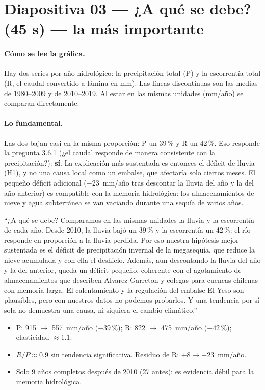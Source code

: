 \documentclass[11pt,letterpaper]{article}
\begin{document}
\section{Diapositiva 03 --- ¿A qué se debe? (45 s) --- la más importante}

\paragraph{Cómo se lee la gráfica.} Hay dos series por año hidrológico: la precipitación total (P) y la
escorrentía total (R, el caudal convertido a lámina en mm). Las líneas discontinuas son las medias de
1980--2009 y de 2010--2019. Al estar en las mismas unidades (mm/año) se comparan directamente.

\paragraph{Lo fundamental.} Las dos bajan casi en la misma proporción: P un 39\,\% y R un 42\,\%. Eso responde
la pregunta 3.6.1 (¿el caudal responde de manera consistente con la precipitación?): \textbf{sí}. La
explicación más sustentada es entonces el déficit de lluvia (H1), y no una causa local como un embalse, que
afectaría solo ciertos meses. El pequeño déficit adicional ($-23$~mm/año tras descontar la lluvia del año y la
del año anterior) es compatible con la memoria hidrológica: los almacenamientos de nieve y agua subterránea se
van vaciando durante una sequía de varios años.

\begin{guion}
``¿A qué se debe? Comparamos en las mismas unidades la lluvia y la escorrentía de cada año. Desde 2010, la
lluvia bajó un 39\,\% y la escorrentía un 42\,\%: el río responde en proporción a la lluvia perdida. Por eso
nuestra hipótesis mejor sustentada es el déficit de precipitación invernal de la megasequía, que reduce la
nieve acumulada y con ella el deshielo. Además, aun descontando la lluvia del año y la del anterior, queda un
déficit pequeño, coherente con el agotamiento de almacenamientos que describen Alvarez-Garreton y colegas para
cuencas chilenas con memoria larga. El calentamiento y la regulación del embalse El Yeso son plausibles,
pero con nuestros datos no podemos probarlos. Y una tendencia por sí sola no demuestra una causa, ni siquiera
el cambio climático.''
\end{guion}

\begin{cifras}
\begin{itemize}
\item P: 915 $\rightarrow$ 557~mm/año ($-39$\,\%); R: 822 $\rightarrow$ 475~mm/año ($-42$\,\%); elasticidad $\approx1.1$.
\item $R/P\approx0.9$ sin tendencia significativa. Residuo de R: $+8 \rightarrow -23$~mm/año.
\item Solo 9 años completos después de 2010 (27 antes): es evidencia débil para la memoria hidrológica.
\end{itemize}
\end{cifras}
\end{document}
